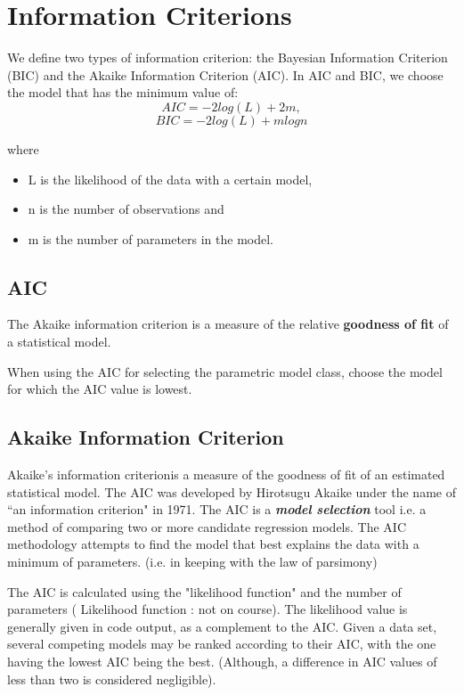 \documentclass[a4paper,12pt]{article}
\begin{document}
\section{Information Criterions}


We define two types of information criterion: the Bayesian Information
Criterion (BIC) and the Akaike Information Criterion (AIC). In AIC and BIC, we choose the model that
has the minimum value of:
\[AIC = −2log(L)+2m,\]
\[BIC = −2log(L)+mlogn\]

where
\begin{itemize}
\item L is the likelihood of the data with a certain model,
\item n is the number of observations and
\item m is the number of parameters in the model.
\end{itemize}
\subsection{AIC}
The Akaike information criterion is a measure of the relative \textbf{goodness of fit} of a statistical model.

When using the AIC for selecting the parametric model class, choose
the model for which the AIC value is lowest.


\subsection{Akaike Information Criterion}


Akaike's information criterionis a measure of the goodness of fit of
an estimated statistical model. The AIC was developed by Hirotsugu Akaike under the name of ``an information criterion" in 1971. The AIC is a \textbf{\textit{model selection}} tool i.e. a method of comparing two
or more candidate regression models. The AIC methodology attempts to find the model that best explains the data with a minimum of parameters. (i.e. in keeping with the law of parsimony)

The AIC is calculated using the "likelihood function" and the number of parameters ( Likelihood function : not on course). The likelihood value is generally given in code output, as a complement to the AIC.
Given a data set, several competing models may be ranked according to their AIC, with the one having the lowest AIC being the best. (Although, a difference in AIC values of less than two is considered negligible).
\end{document}
